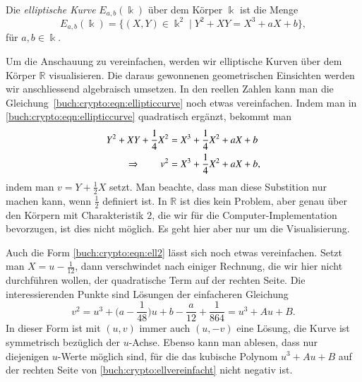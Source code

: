 \begin{definition}
\label{buch:crypto:def:ellipticcurve}
Die {\em elliptische Kurve} $E_{a,b}(\Bbbk)$ über dem Körper $\Bbbk$ ist 
die Menge
\[
E_{a,b}(\Bbbk)
=
\{(X,Y)\in\Bbbk^2\;|\;Y^2+XY=X^3+aX+b\},
\]
für $a,b\in\Bbbk$.
\end{definition}

Um die Anschauung zu vereinfachen, werden wir elliptische Kurven über
dem Körper $\mathbb{R}$ visualisieren.
Die daraus gewonnenen geometrischen Einsichten werden wir anschliessend
algebraisch umsetzen.
In den reellen Zahlen kann man die
Gleichung~\eqref{buch:crypto:eqn:ellipticcurve}
noch etwas vereinfachen.
Indem man in \eqref{buch:crypto:eqn:ellipticcurve} 
quadratisch ergänzt, bekommt man
\begin{align}
Y^2 + XY + \frac14X^2 &= X^3+\frac14 X^2 +aX+b
\notag
\\
\Rightarrow\qquad
v^2&=X^3+\frac14X^2+aX+b,
\label{buch:crypto:eqn:ell2}
\end{align}
indem man $v=Y+\frac12X$ setzt.
Man beachte, dass man diese Substition nur machen kann, wenn $\frac12$
definiert ist.
In $\mathbb{R}$ ist dies kein Problem, aber genau über den Körpern
mit Charakteristik $2$, die wir für die Computer-Implementation
bevorzugen, ist dies nicht möglich.
Es geht hier aber nur um die Visualisierung.

Auch die Form \eqref{buch:crypto:eqn:ell2} lässt sich noch etwas 
vereinfachen.
Setzt man $X=u-\frac1{12}$, dann verschwindet nach einiger Rechnung,
die wir hier nicht durchführen wollen, der quadratische Term
auf der rechten Seite.
Die interessierenden Punkte sind Lösungen der einfacheren Gleichung
\begin{equation}
v^2
=
u^3+\biggl(a-\frac{1}{48}\biggr)u + b-\frac{a}{12}+\frac{1}{864}
=
u^3+Au+B.
\label{buch:crypto:ellvereinfacht}
\end{equation}
In dieser Form ist mit $(u,v)$ immer auch $(u,-v)$ eine Lösung,
die Kurve ist symmetrisch bezüglich der $u$-Achse.
Ebenso kann man ablesen, dass nur diejenigen $u$-Werte möglich sind,
für die das kubische Polynom $u^3+Au+B$ auf der rechten Seite von
\eqref{buch:crypto:ellvereinfacht}
nicht negativ ist.

